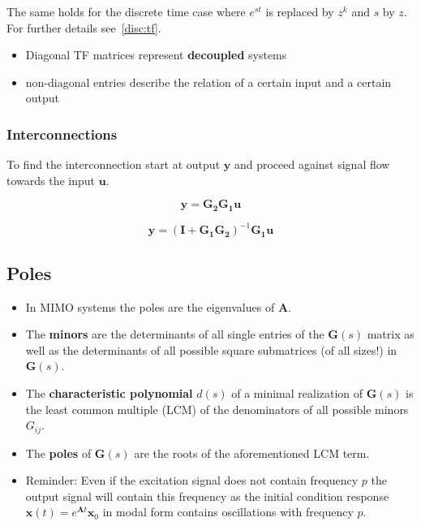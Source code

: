 
The same holds for the discrete time case where $e^{st}$ is replaced by $z^k$ and $s$ by $z$. For further details see~\ref{disc:tf}.

\newpar{}
\begin{itemize}
    \item Diagonal TF matrices represent \textbf{decoupled} systems
    \item non-diagonal entries describe the relation of a certain input and a certain output
\end{itemize}

\subsubsection{Interconnections}

To find the interconnection start at output $\mathbf{y}$ and proceed against signal flow towards the input $\mathbf{u}$.

\newpar{}
\newpar{}
\begin{center}
    
\end{center}

\begin{equation*}
    \mathbf{y}=\mathbf{G_2G_1u}
\end{equation*}

\newpar{}
\newpar{}
\begin{center}
    
\end{center}

\begin{equation*}
    \mathbf{y}={(\mathbf{I}+\mathbf{G_1G_2})}^{-1}\mathbf{G_1u}
\end{equation*}


\subsection{Poles}

\begin{itemize}
    \item In MIMO systems the poles are the eigenvalues of $\mathbf{A}$.
    \item The \textbf{minors} are the determinants of all single entries of the $\mathbf{G}(s)$ matrix as well as the determinants of all possible square submatrices (of all sizes!) in $\mathbf{G}(s)$.
    \item The \textbf{characteristic polynomial} $d(s)$ of a minimal realization of $\mathbf{G}(s)$ is the least common multiple (LCM) of the denominators of all possible minors $G_{ij}$.
    \item The \textbf{poles} of $\mathbf{G}(s)$ are the roots of the aforementioned LCM term.
    \item Reminder: Even if the excitation signal does not contain frequency $p$ the output signal will contain this frequency as the initial condition response $\mathbf{x}(t) = e^{\mathbf{A}t}\mathbf{x}_0$ in modal form contains oscillations with frequency $p$.
\end{itemize}


